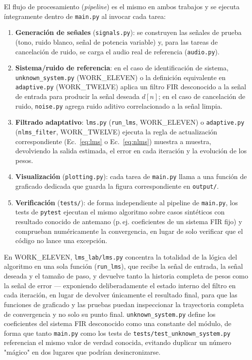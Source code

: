 El flujo de procesamiento (\textit{pipeline}) es el mismo en ambos
trabajos y se ejecuta íntegramente dentro de \texttt{main.py} al
invocar cada tarea:

\begin{enumerate}
  \item \textbf{Generación de señales} (\texttt{signals.py}): se
  construyen las señales de prueba (tono, ruido blanco, señal de
  potencia variable) y, para las tareas de cancelación de ruido, se
  carga el audio real de referencia (\texttt{audio.py}).
  \item \textbf{Sistema/ruido de referencia}: en el caso de
  identificación de sistema, \texttt{unknown\_system.py} (WORK\_ELEVEN)
  o la definición equivalente en \texttt{adaptive.py} (WORK\_TWELVE)
  aplica un filtro FIR desconocido a la señal de entrada para producir
  la señal deseada $d[n]$; en el caso de cancelación de ruido,
  \texttt{noise.py} agrega ruido aditivo correlacionado a la señal
  limpia.
  \item \textbf{Filtrado adaptativo}: \texttt{lms.py}
  (\texttt{run\_lms}, WORK\_ELEVEN) o \texttt{adaptive.py}
  (\texttt{nlms\_filter}, WORK\_TWELVE) ejecuta la regla de
  actualización correspondiente (Ec.~\ref{eq:lms} o
  Ec.~\ref{eq:nlms}) muestra a muestra, devolviendo la salida
  estimada, el error en cada iteración y la evolución de los pesos.
  \item \textbf{Visualización} (\texttt{plotting.py}): cada tarea de
  \texttt{main.py} llama a una función de graficado dedicada que
  guarda la figura correspondiente en \texttt{output/}.
  \item \textbf{Verificación} (\texttt{tests/}): de forma
  independiente al pipeline de \texttt{main.py}, los tests de
  \texttt{pytest} ejecutan el mismo algoritmo sobre casos sintéticos
  con resultado conocido de antemano (p.\,ej. coeficientes de un
  sistema FIR fijo) y comprueban numéricamente la convergencia, en
  lugar de solo verificar que el código no lance una excepción.
\end{enumerate}

En WORK\_ELEVEN, \texttt{lms\_lab/lms.py} concentra la totalidad de la
lógica del algoritmo en una sola función (\texttt{run\_lms}), que
recibe la señal de entrada, la señal deseada y el tamaño de paso, y
devuelve tanto la historia completa de pesos como la señal de error —
exponiendo deliberadamente el estado interno del filtro en cada
iteración, en lugar de devolver únicamente el resultado final, para
que las funciones de graficado y las pruebas puedan inspeccionar la
trayectoria completa de convergencia y no solo su punto final.
\texttt{unknown\_system.py} define los coeficientes del sistema FIR
desconocido como una constante del módulo, de forma que tanto
\texttt{main.py} como los tests de \texttt{tests/test\_unknown\_system.py}
referencian el mismo valor de verdad conocida, evitando duplicar un
número "mágico" en dos lugares que podrían desincronizarse.


